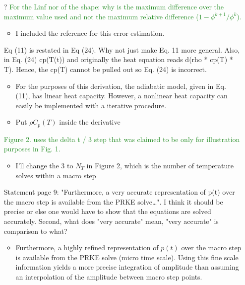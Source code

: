 \documentclass{elsarticle}
\newcommand{\nofix}{?}
\newcommand{\done}{\checkmark}
\newcommand{\easy}[1]{\textcolor{ForestGreen}{#1}}
\newcommand{\medm}[1]{\textcolor{BurntOrange}{#1}}
\begin{document}
\begin{itemize}
\item[\nofix] \easy{ For the Linf nor of the shape: why is the maximum difference over the maximum value used and not the maximum relative difference ($1 - \phi^{k+1}/\phi^k$). }
\begin{itemize}
\item I included the reference for this error estimation.
\end{itemize}

\item[\done] \medm{ Eq (11) is restated in Eq (24). Why not just make Eq. 11 more general. Also, in Eq. (24) cp(T(t)) and originally the heat equation reads d(rho * cp(T) * T). Hence, the cp(T) cannot be pulled out so Eq. (24) is incorrect. }
\begin{itemize}
\item For the purposes of this derivation, the adiabatic model, given in Eq. (11), has linear heat capacity. However, a nonlinear heat capacity can easily be implemented with a iterative procedure.
\item Put $\rho C_p(T)$ inside the derivative 
\end{itemize}

\item[\done] \easy{ Figure 2. uses the delta t / 3 step that was claimed to be only for illustration purposes in Fig. 1. }
\begin{itemize}
\item I'll change the 3 to $N_{T}$ in Figure 2, which is the number of temperature solves within a macro step
\end{itemize}

\item[\done] \medm{ Statement page 9: "Furthermore, a very accurate representation of p(t) over the macro step is available from the PRKE solve…". I think it should be precise or else one would have to show that the equations are solved accurately. Second, what does "very accurate" mean, "very accurate" is comparison to what? }
\begin{itemize}
\item Furthermore, a highly refined representation of $p(t)$ over the macro step is available from the PRKE solve (micro time scale). Using this fine scale information yields a more precise integration of amplitude than assuming an interpolation of the amplitude between macro step points.
\end{itemize}


\end{itemize}
\end{document}
